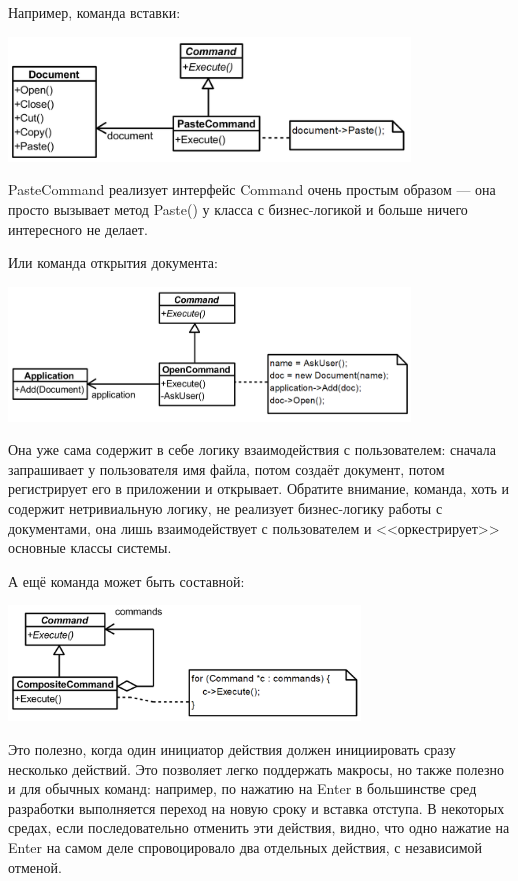 \documentclass{../text-style}
\begin{document}
Например, команда вставки:

\begin{center}
    \includegraphics[width=0.8\textwidth]{pasteCommand.png}
\end{center}

PasteCommand реализует интерфейс Command очень простым образом --- она просто вызывает метод Paste() у класса с бизнес-логикой и больше ничего интересного не делает.

Или команда открытия документа:

\begin{center}
    \includegraphics[width=0.8\textwidth]{openDocumentCommand.png}
\end{center}

Она уже сама содержит в себе логику взаимодействия с пользователем: сначала запрашивает у пользователя имя файла, потом создаёт документ, потом регистрирует его в приложении и открывает. Обратите внимание, команда, хоть и содержит нетривиальную логику, не реализует бизнес-логику работы с документами, она лишь взаимодействует с пользователем и <<оркестрирует>> основные классы системы.

А ещё команда может быть составной:

\begin{center}
    \includegraphics[width=0.7\textwidth]{compositeCommand.png}
\end{center}

Это полезно, когда один инициатор действия должен инициировать сразу несколько действий. Это позволяет легко поддержать макросы, но также полезно и для обычных команд: например, по нажатию на Enter в большинстве сред разработки выполняется переход на новую сроку и вставка отступа. В некоторых средах, если последовательно отменить эти действия, видно, что одно нажатие на Enter на самом деле спровоцировало два отдельных действия, с независимой отменой.
\end{document}

